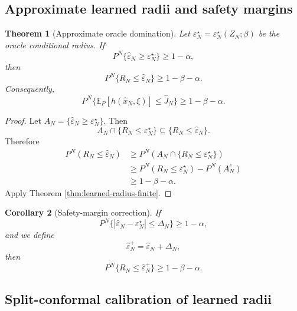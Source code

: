 \documentclass[11pt]{article}
\newtheorem{theorem}{Theorem}[section]
\newtheorem{corollary}[theorem]{Corollary}
\newcommand{\E}{\mathbb{E}}
\newcommand{\1}{\mathbf{1}}
\newcommand{\epshat}{\widehat\varepsilon_N}
\begin{document}
\subsection{Approximate learned radii and safety margins}

\begin{theorem}[Approximate oracle domination]\label{thm:approx-oracle}
Let $\varepsilon_N^\star=\varepsilon_N^\star(Z_N;\beta)$ be the oracle conditional radius. If
\begin{equation}
    P^N\{\epshat\ge \varepsilon_N^\star\}\ge1-\alpha,
\end{equation}
then
\begin{equation}
    P^N\{R_N\le\epshat\}\ge1-\beta-\alpha.
\end{equation}
Consequently,
\begin{equation}
    P^N\{\E_P[h(\widehat x_N,\xi)]\le\widehat J_N\}\ge1-\beta-\alpha.
\end{equation}
\end{theorem}

\begin{proof}
Let $A_N=\{\epshat\ge\varepsilon_N^\star\}$. Then
\begin{equation}
    A_N\cap\{R_N\le\varepsilon_N^\star\}\subseteq\{R_N\le\epshat\}.
\end{equation}
Therefore
\begin{align*}
P^N(R_N\le\epshat)
&\ge P^N(A_N\cap\{R_N\le\varepsilon_N^\star\})\\
&\ge P^N(R_N\le\varepsilon_N^\star)-P^N(A_N^c)\\
&\ge1-\beta-\alpha.
\end{align*}
Apply Theorem \ref{thm:learned-radius-finite}.
\end{proof}

\begin{corollary}[Safety-margin correction]\label{cor:safety-margin}
If
\begin{equation}
    P^N\{|\epshat-\varepsilon_N^\star|\le\Delta_N\}\ge1-\alpha,
\end{equation}
and we define
\begin{equation}
    \epshat^+=\epshat+\Delta_N,
\end{equation}
then
\begin{equation}
    P^N\{R_N\le\epshat^+\}\ge1-\beta-\alpha.
\end{equation}
\end{corollary}

\subsection{Split-conformal calibration of learned radii}
\end{document}
